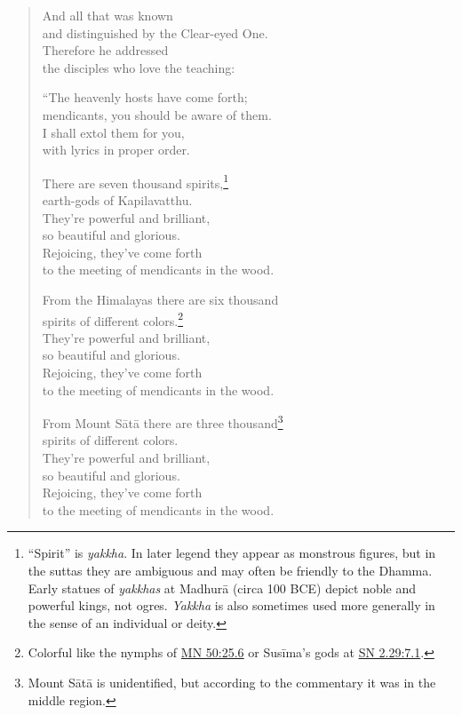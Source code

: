 \documentclass[12pt,openany]{book}%
\begin{document}
\begin{verse}
And all that was known \\
and distinguished by the Clear-eyed One. \\
Therefore he addressed \\
the disciples who love the teaching: 

“The heavenly hosts have come forth; \\
mendicants, you should be aware of them. \\
I shall extol them for you, \\
with lyrics in proper order. 

There are seven thousand spirits,\footnote{“Spirit” is \textit{yakkha}. In later legend they appear as monstrous figures, but in the suttas they are ambiguous and may often be friendly to the Dhamma. Early statues of \textit{yakkhas} at \textsanskrit{Madhurā} (circa 100 BCE) depict noble and powerful kings, not ogres. \textit{Yakkha} is also sometimes used more generally in the sense of an individual or deity. } \\
earth-gods of Kapilavatthu. \\
They’re powerful and brilliant, \\
so beautiful and glorious. \\
Rejoicing, they’ve come forth \\
to the meeting of mendicants in the wood. 

From the Himalayas there are six thousand \\
spirits of different colors.\footnote{Colorful like the nymphs of \href{https://suttacentral.net/mn50/en/sujato\#25.6}{MN 50:25.6} or \textsanskrit{Susīma}’s gods at \href{https://suttacentral.net/sn2.29/en/sujato\#7.1}{SN 2.29:7.1}. } \\
They’re powerful and brilliant, \\
so beautiful and glorious. \\
Rejoicing, they’ve come forth \\
to the meeting of mendicants in the wood. 

From Mount \textsanskrit{Sātā} there are three thousand\footnote{Mount \textsanskrit{Sātā} is unidentified, but according to the commentary it was in the middle region. } \\
spirits of different colors. \\
They’re powerful and brilliant, \\
so beautiful and glorious. \\
Rejoicing, they’ve come forth \\
to the meeting of mendicants in the wood. 


\end{verse}
\end{document}
